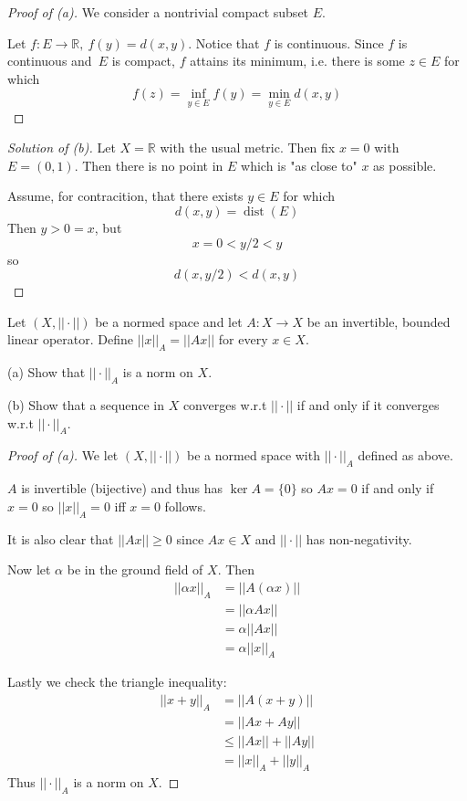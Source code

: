 \begin{proof}[Proof of (a)]
    We consider a nontrivial compact subset $E$. 

    Let $f: E \to \mathbb R, \ f(y) = d(x,y)$. 
    Notice that $f$ is continuous. Since $f$ is continuous 
    and $E$ is compact, $f$ attains its minimum, i.e. 
    there is some $z \in E$ for which 
    \[
        f(z) = \inf_{y\in E}f(y) = \min_{y\in E}d(x,y)
    \]
\end{proof}
\begin{proof}[Solution of (b)]
    Let $X = \mathbb R$ with the usual metric. Then 
    fix $x = 0$ with $E = (0,1)$. Then there is no point 
    in $E$ which is "as close to" $x$ as possible. 

    Assume, for contracition, that there exists $y \in E$ for which 
    \[
        d(x,y) = \operatorname{dist}(E) 
    \]
    Then $y > 0 = x$, but 
    \[
        x = 0 < y/2 < y
    \]
    so 
    \[
        d(x,y/2) < d(x,y)  
    \]
\end{proof}
\begin{prob}
    Let $(X,||\cdot||)$ be a normed space and let $A : X \to X$ be 
    an invertible, bounded linear operator. Define 
    $||x||_A = ||Ax||$ for every $x \in X$.

    (a) Show that $||\cdot||_A$ is a norm on $X$.

    (b) Show that a sequence in $X$ converges w.r.t $||\cdot||$ 
    if and only if it converges w.r.t $||\cdot||_A$.
\end{prob}
\begin{proof}[Proof of (a)]
    We let $(X,||\cdot||)$ be a normed space with 
    $||\cdot||_A$ defined as above. 

    $A$ is invertible (bijective) and thus has 
    $\ker A = \{0\}$ so $Ax = 0$ if and only if $x = 0$ so 
    $||x||_A = 0$ iff $x = 0$ follows.
    
    It is also clear that $||Ax|| \geq 0$ since $Ax \in X$ and 
    $||\cdot||$ has non-negativity.
    
    Now let $\alpha$ be in the ground field of $X$. 
    Then 
    \begin{align*}
        ||\alpha x||_A &= ||A(\alpha x)|| \\ 
                       &= ||\alpha A x|| \\ 
                       &= \alpha ||Ax|| \\ 
                       &= \alpha ||x||_A
    \end{align*}

    Lastly we check the triangle inequality: 
    \begin{align*}
        ||x+y||_A &= ||A(x+y)|| \\ 
                  &= ||Ax + Ay|| \\ 
                  &\leq ||Ax|| + ||Ay|| \\ 
                  &= ||x||_A + ||y||_A
    \end{align*}
    Thus $||\cdot||_A$ is a norm on $X$.
\end{proof}
